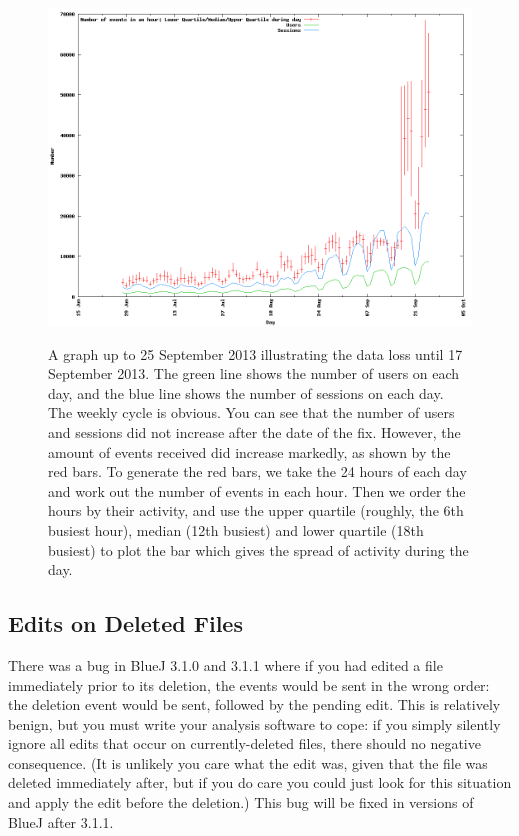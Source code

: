 \documentclass{report}
\begin{document}
\begin{figure}
\includegraphics[width=\textwidth]{data-loss.png}
\label{fig:data-loss}
\caption{A graph up to 25 September 2013 illustrating the data loss until 17 September 2013.  The green line shows the number of users on each day, and the blue line shows the number of sessions on each day.  The weekly cycle is obvious.  You can see that the number of users and sessions did not increase after the date of the fix.  However, the amount of events received did increase markedly, as shown by the red bars.  To generate the red bars, we take the 24 hours of each day and work out the number of events in each hour.  Then we order the hours by their activity, and use the upper quartile (roughly, the 6th busiest hour), median (12th busiest) and lower quartile (18th busiest) to plot the bar which gives the spread of activity during the day.
}
\end{figure}

\subsection{Edits on Deleted Files}

There was a bug in BlueJ 3.1.0 and 3.1.1 where if you had edited a file immediately prior to its deletion, the events would be sent in the wrong order: the deletion event would be sent, followed by the pending edit.  This is relatively benign, but you must write your analysis software to cope: if you simply silently ignore all edits that occur on currently-deleted files, there should no negative consequence.  (It is unlikely you care what the edit was, given that the file was deleted immediately after, but if you do care you could just look for this situation and apply the edit before the deletion.)  This bug will be fixed in versions of BlueJ after 3.1.1.
\end{document}
